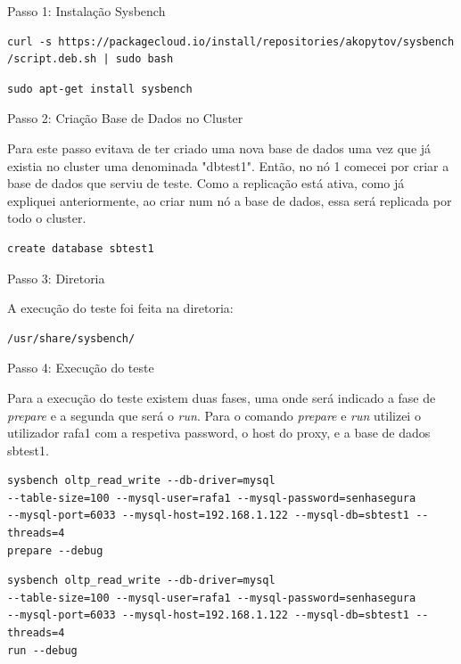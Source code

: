\hfill \break
\indent Passo 1: Instalação Sysbench

\begin{verbatim}curl -s https://packagecloud.io/install/repositories/akopytov/sysbench
/script.deb.sh | sudo bash\end{verbatim}

\begin{verbatim}sudo apt-get install sysbench\end{verbatim}

\hfill \break
\indent Passo 2: Criação Base de Dados no Cluster

\hfill \break
\indent Para este passo evitava de ter criado uma nova base de dados uma vez que já existia no cluster uma denominada "dbtest1". Então, no nó 1 comecei por criar a base de dados que serviu de teste. Como a replicação está ativa, como já expliquei anteriormente, ao criar num nó a base de dados, essa será replicada por todo o cluster.

\begin{verbatim}create database sbtest1\end{verbatim}

\hfill \break
\indent Passo 3: Diretoria 

\hfill \break
\indent A execução do teste foi feita na diretoria:
\begin{verbatim}/usr/share/sysbench/\end{verbatim}

\hfill \break
\indent Passo 4: Execução do teste

\hfill \break
\indent Para a execução do teste existem duas fases, uma onde será indicado a fase de \textit{prepare} e a segunda que será o \textit{run}.
Para o comando \textit{prepare} e \textit{run} utilizei o utilizador rafa1 com a respetiva password, o host do proxy, e a base de dados sbtest1.

\begin{verbatim}sysbench oltp_read_write --db-driver=mysql 
--table-size=100 --mysql-user=rafa1 --mysql-password=senhasegura 
--mysql-port=6033 --mysql-host=192.168.1.122 --mysql-db=sbtest1 --threads=4 
prepare --debug\end{verbatim}

\newpage
\begin{verbatim}sysbench oltp_read_write --db-driver=mysql 
--table-size=100 --mysql-user=rafa1 --mysql-password=senhasegura 
--mysql-port=6033 --mysql-host=192.168.1.122 --mysql-db=sbtest1 --threads=4 
run --debug\end{verbatim}

